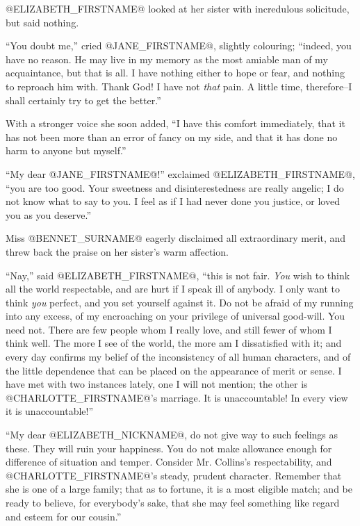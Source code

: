 @ELIZABETH_FIRSTNAME@ looked at her sister with incredulous solicitude, but said
nothing.

``You doubt me,'' cried @JANE_FIRSTNAME@, slightly colouring; ``indeed, you have
no reason. He may live in my memory as the most amiable man of my
acquaintance, but that is all. I have nothing either to hope or fear,
and nothing to reproach him with. Thank God! I have not \textit{that} pain. A
little time, therefore--I shall certainly try to get the better.''

With a stronger voice she soon added, ``I have this comfort immediately,
that it has not been more than an error of fancy on my side, and that it
has done no harm to anyone but myself.''

``My dear @JANE_FIRSTNAME@!'' exclaimed @ELIZABETH_FIRSTNAME@, ``you are too good. Your sweetness
and disinterestedness are really angelic; I do not know what to say
to you. I feel as if I had never done you justice, or loved you as you
deserve.''

Miss @BENNET_SURNAME@ eagerly disclaimed all extraordinary merit, and threw back
the praise on her sister's warm affection.

``Nay,'' said @ELIZABETH_FIRSTNAME@, ``this is not fair. \textit{You} wish to think all the
world respectable, and are hurt if I speak ill of anybody. I only want
to think \textit{you} perfect, and you set yourself against it. Do not
be afraid of my running into any excess, of my encroaching on your
privilege of universal good-will. You need not. There are few people
whom I really love, and still fewer of whom I think well. The more I see
of the world, the more am I dissatisfied with it; and every day confirms
my belief of the inconsistency of all human characters, and of the
little dependence that can be placed on the appearance of merit or
sense. I have met with two instances lately, one I will not mention; the
other is @CHARLOTTE_FIRSTNAME@'s marriage. It is unaccountable! In every view it is
unaccountable!''

``My dear @ELIZABETH_NICKNAME@, do not give way to such feelings as these. They will
ruin your happiness. You do not make allowance enough for difference
of situation and temper. Consider Mr. Collins's respectability, and
@CHARLOTTE_FIRSTNAME@'s steady, prudent character. Remember that she is one of a
large family; that as to fortune, it is a most eligible match; and be
ready to believe, for everybody's sake, that she may feel something like
regard and esteem for our cousin.''

